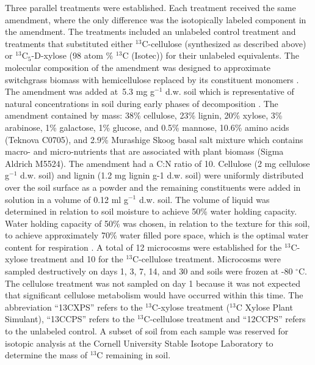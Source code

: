 \documentclass{article}
\begin{document}
Three parallel treatments were established. Each treatment received the same
amendment, where the only difference was the isotopically labeled component in
the amendment. The treatments included an unlabeled control treatment and
treatments that substituted either $^{13}$C-cellulose (synthesized as described
above) or $^{13}$C$_{5}$-D-xylose (98 atom \% $^{13}$C (Isotec)) for their
unlabeled equivalents. The molecular composition of the amendment was designed
to approximate switchgrass biomass with hemicellulose replaced by its
constituent monomers \citep{Yan_2010,David_2010}. The amendment was added
at~5.3 mg g$^{-1}$ d.w. soil which is representative of natural concentrations
in soil during early phases of decomposition \citep{Schneckenberger_2008}. The
amendment contained by mass: 38\% cellulose, 23\% lignin, 20\% xylose, 3\%
arabinose, 1\% galactose, 1\% glucose, and 0.5\% mannose, 10.6\% amino acids
(Teknova C0705), and 2.9\% Murashige Skoog basal salt mixture which contains
macro- and micro-nutrients that are associated with plant biomass (Sigma
Aldrich M5524). The amendment had a C:N ratio of
10. Cellulose (2 mg cellulose g$^{-1}$ d.w. soil) and lignin (1.2 mg lignin g-1
d.w. soil) were uniformly distributed over the soil surface as a powder and
the remaining constituents were added in solution in a volume of
0.12 ml g$^{-1}$ d.w. soil. The volume of liquid was determined in relation to
soil moisture to achieve 50\% water holding capacity. Water holding capacity
of 50\% was chosen, in relation to the texture for this soil, to achieve
approximately 70\% water filled pore space, which is the optimal water content
for respiration \citep{Linn_1984}. A total of 12 microcosms were established
for the $^{13}$C-xylose treatment and 10 for the $^{13}$C-cellulose treatment.
Microcosms were sampled destructively on days 1, 3, 7, 14, and 30 and soils
were frozen at -80 $^{\circ}$C. The cellulose treatment was not sampled on day
1 because it was not expected that significant cellulose metabolism would have
occurred within this time. The abbreviation “13CXPS” refers to the
$^{13}$C-xylose treatment ($^{13}$C Xylose Plant Simulant), “13CCPS” refers to
the $^{13}$C-cellulose treatment and “12CCPS” refers to the unlabeled control.
A subset of soil from each sample was reserved for isotopic analysis at the
Cornell University Stable Isotope Laboratory to determine the mass of $^{13}$C
remaining in soil.
\end{document}
